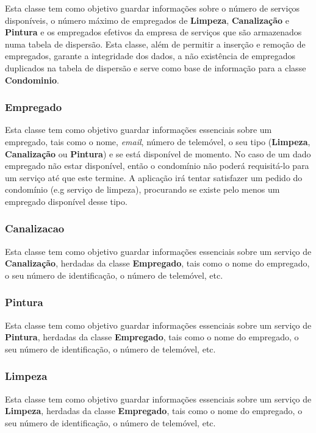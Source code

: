 \documentclass[a4paper]{article}
\begin{document}
Esta classe tem como objetivo guardar informações sobre o número de serviços disponíveis, o número máximo de empregados de \textbf{Limpeza}, \textbf{Canalização} e \textbf{Pintura} e os empregados efetivos da empresa de serviços que são armazenados numa tabela de dispersão. Esta classe, além de permitir a inserção e remoção de empregados, garante a integridade dos dados, a não existência de empregados duplicados na tabela de dispersão e serve como base de informação para a classe \textbf{Condominio}. 

\subsubsection{Empregado}

Esta classe tem como objetivo guardar informações essenciais sobre um empregado, tais como o nome, \textit{email}, número de telemóvel, o seu tipo (\textbf{Limpeza}, \textbf{Canalização} ou \textbf{Pintura}) e se está disponível de momento. No caso de um dado empregado não estar disponível, então o condomínio não poderá requisitá-lo para um serviço até que este termine. A aplicação irá tentar satisfazer um pedido do condomínio (e.g serviço de limpeza), procurando se existe pelo menos um empregado disponível desse tipo.

\subsubsection{Canalizacao}

Esta classe tem como objetivo guardar informações essenciais sobre um serviço de \textbf{Canalização}, herdadas da classe \textbf{Empregado}, tais como o nome do empregado, o seu número de identificação, o número de telemóvel, etc.

\subsubsection{Pintura}

Esta classe tem como objetivo guardar informações essenciais sobre um serviço de \textbf{Pintura}, herdadas da classe \textbf{Empregado}, tais como o nome do empregado, o seu número de identificação, o número de telemóvel, etc.

\subsubsection{Limpeza}

Esta classe tem como objetivo guardar informações essenciais sobre um serviço de \textbf{Limpeza}, herdadas da classe \textbf{Empregado}, tais como o nome do empregado, o seu número de identificação, o número de telemóvel, etc.
\end{document}
